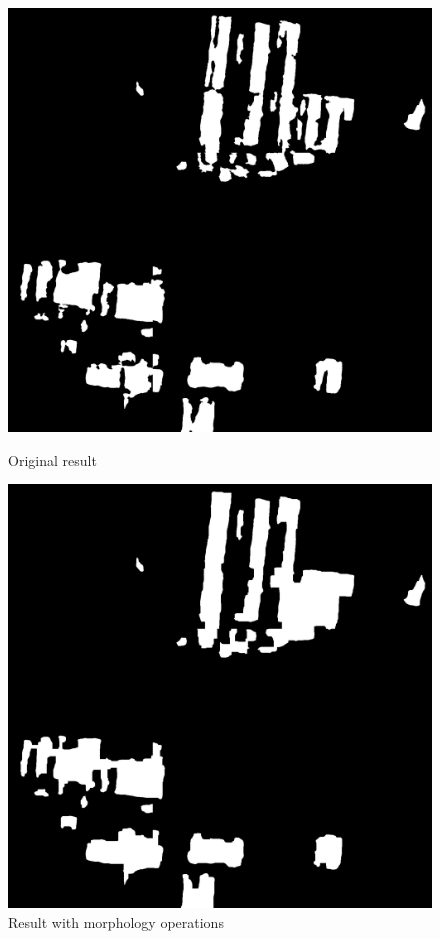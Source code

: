 \documentclass[]{IEEEtran}
\begin{document}
\begin{figure}
	\vspace{0.5cm}
		\centering
		\includegraphics[width=0.7\columnwidth]{fw}
		\caption{Original result}
		\label{fig:fw}
	\vspace{0.3cm}
		\centering
		\includegraphics[width=0.7\columnwidth]{filter}
		\caption{Result with morphology operations}
		\label{fig:rt}
\end{figure}





\end{document}
